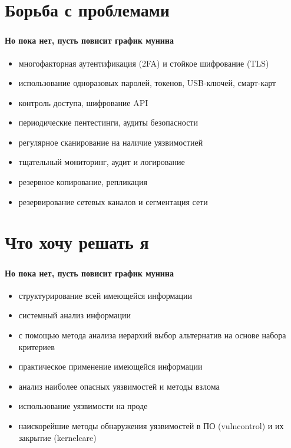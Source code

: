 

\section{Борьба с проблемами}

\begin{frame}
\frametitle{\insertsection}
\framesubtitle{Но пока нет, пусть повисит график мунина}

\begin{itemize}
    \item многофакторная аутентификация (2FA) и стойкое шифрование (TLS)
    \item использование одноразовых паролей, токенов, USB-ключей, смарт-карт
    \item контроль доступа, шифрование API
    \item периодические пентестинги, аудиты безопасности
    \item регулярное сканирование на наличие уязвимостией
    \item тщательный мониторинг, аудит и логирование
    \item резервное копирование, репликация
    \item резервирование сетевых каналов и сегментация сети
\end{itemize}
\end{frame}


\section{Что хочу решать я}

\begin{frame}
\frametitle{\insertsection}
\framesubtitle{Но пока нет, пусть повисит график мунина}

\begin{itemize}
    \item структурирование всей имеющейся информации
    \item системный анализ информации
    \item с помощью метода анализа иерархий выбор альтернатив на основе набора критериев
    \item практическое применение имеющейся информации
    \item анализ наиболее опасных уязвимостей и методы взлома
    \item использование уязвимости на проде
    \item наискорейшие методы обнаружения уязвимостей в ПО (vulncontrol) и их закрытие (kernelcare)
\end{itemize}
\end{frame}

